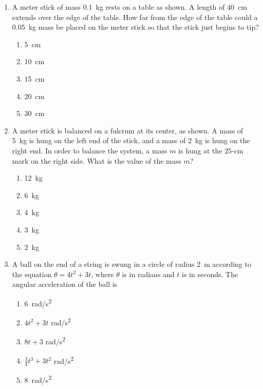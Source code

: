 \documentclass{../../oss-apphys}
\begin{document}
\begin{multicols}{2}
\begin{enumerate}[leftmargin=18pt]
  \item A meter stick of mass \SI{0.1}{\kg} rests on a table as shown. A length
    of \SI{40}{\cm} extends over the edge of the table. How far from the edge of
    the table could a \SI{.05}{kg} mass be placed on the meter stick so that the
    stick just begins to tip?
    \begin{center}
      \vspace{-.2in}
    \end{center}
    \begin{enumerate}[noitemsep,topsep=0pt]
    \item\vspace{-.2in}\SI{5 }{\cm}
    \item\SI{10}{\cm}
    \item\SI{15}{\cm}
    \item\SI{20}{\cm}
    \item\SI{30}{\cm}
    \end{enumerate}

  \item A meter stick is balanced on a fulcrum at its center, as shown. A mass
    of \SI{5}{\kg} is hung on the left end of the stick, and a mass of
    \SI{2}{kg}
    is hung on the right end. In order to balance the system, a mass $m$ is hung
    at the $25$-\si{cm} mark on the right side. What is the value of the mass
    $m$?
    \begin{center}
    \end{center}
    \begin{enumerate}[noitemsep,topsep=0pt]
    \item\SI{12}{\kg}
    \item\SI{6 }{\kg}
    \item\SI{4 }{\kg}
    \item\SI{3 }{\kg}
    \item\SI{2 }{\kg}
    \end{enumerate}
    
  \item A ball on the end of a string is swung in a circle of radius \SI{2}{m}
    according to the equation $\theta = 4t^2 + 3t$, where $\theta$ is in radians
    and $t$ is in seconds. The angular acceleration of the ball is
    \begin{enumerate}[noitemsep,topsep=0pt]
    \item\SI{6}{rad/s^2}
    \item $4t^2 + 3t$ \si{rad/s^2}
    \item $8t +3$ \si{rad/s^2}
    \item $\frac{3}{4} t^3 + 3t^2$ \si{rad/s^2}
    \item \SI{8}{rad/s^2}
    \end{enumerate}
    \columnbreak
  

\end{enumerate}
\end{multicols}
\end{document}
